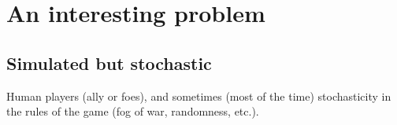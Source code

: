 \section{An interesting problem}
\subsection{Simulated but stochastic}
Human players (ally or foes), and sometimes (most of the time) stochasticity in the rules of the game (fog of war, randomness, etc.).
